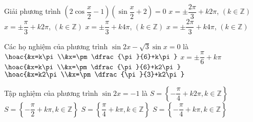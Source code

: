 \begin{ex}%
Giải phương trình $\left( 2\cos \dfrac{x}{2}-1 \right)\left( \sin \dfrac{x}{2}+2 \right)=0$
\choice
{$x = \pm \dfrac{2\pi}{3}+k2\pi$, $\left( k \in \mathbb{Z} \right)$}
{$x = \pm \dfrac{\pi}{3}+k2\pi$, $\left( k \in \mathbb{Z} \right)$}
{$x = \pm \dfrac{\pi}{3}+k4\pi$, $\left( k \in \mathbb{Z} \right)$}
{\True $x = \pm \dfrac{2\pi}{3}+k4\pi$, $\left( k \in \mathbb{Z} \right)$}
\end{ex}

\begin{ex}%
Các họ nghiệm của phương trình $\sin 2x-\sqrt{3}\sin x=0$ là
\choice
{$\hoac{&x=k\pi \\&x=\pm \dfrac{\pi}{6}+k\pi}$}
{$x=\pm \dfrac{\pi}{6}+k\pi$}
{\True $\hoac{&x=k\pi \\&x=\pm \dfrac{\pi}{6}+k2\pi}$}
{$\hoac{&x=k2\pi \\&x=\pm \dfrac{\pi}{3}+k2\pi}$}
\end{ex}

\begin{ex}%
Tập nghiệm của phương trình $\sin 2x=-1$ là
\choice
{$ S=\left\{-\dfrac{\pi}{4}+k2\pi ,k\in\mathbb{Z}\right\}$}
{$ S=\left\{-\dfrac{\pi}{2}+k\pi ,k\in\mathbb{Z}\right\}$}
{$ S=\left\{\dfrac{\pi}{4}+k\pi ,k\in\mathbb{Z}\right\}$}
{\True $ S=\left\{-\dfrac{\pi}{4}+k\pi ,k\in\mathbb{Z}\right\}$}
\end{ex}

